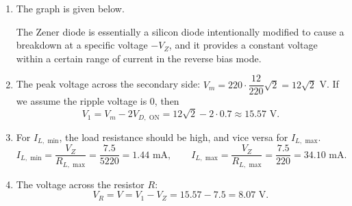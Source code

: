 \documentclass[11pt]{article}
\begin{document}
\begin{enumerate}[leftmargin=*,label=\textbf{\arabic*.}]

\item The graph is given below.

\begin{minipage}{0.45\textwidth}
\end{minipage}\hfill\begin{minipage}{0.45\textwidth}
The Zener diode is essentially a silicon diode intentionally modified to cause a breakdown at a specific voltage $-V_Z$, and it provides a constant voltage within a certain range of current in the reverse bias mode.
\end{minipage}

\item The peak voltage across the secondary side: $V_m=220\cdot\dfrac{12}{220}\sqrt2=12\sqrt2$ V. If we assume the ripple voltage is $0$, then
\[V_1=V_m-2V_{D,\text{ ON}}=12\sqrt2-2\cdot0.7\approx15.57\text{ V}.\]

\item For $I_{L,\text{ min}}$, the load resistance should be high, and vice versa for $I_{L,\text{ max}}$.
\[I_{L,\text{ min}}=\frac{V_Z}{R_{L,\text{ max}}}=\frac{7.5}{5220}=1.44\text{ mA},\qquad I_{L,\text{ max}}=\frac{V_Z}{R_{L,\text{ max}}}=\frac{7.5}{220}=34.10\text{ mA}.\]

\item The voltage across the resistor $R$:
\[V_R=V=V_1-V_Z=15.57-7.5=8.07\text{ V}.\]


\end{enumerate}
\end{document}
